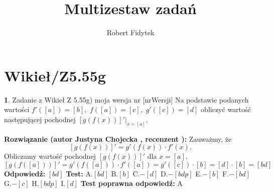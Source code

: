 \documentclass[12pt, a4paper]{article}
\title{Multizestaw zadań}
\author{Robert Fidytek}
\date{}
\theoremstyle{definition} %
\newtheorem{zad}{}
\newcommand{\kategoria}[1]{\section{#1}} %
\newcommand{\zadStart}[1]{\begin{zad}#1\newline} %
\newcommand{\zadStop}{\end{zad}}   %
\newcommand{\rozwStart}[2]{\noindent \textbf{Rozwiązanie (autor #1 , recenzent #2): }\newline} %
\newcommand{\rozwStop}{\newline}                                            %
\newcommand{\odpStart}{\noindent \textbf{Odpowiedź:}\newline}    %
\newcommand{\odpStop}{\newline}                                             %
\newcommand{\testStart}{\noindent \textbf{Test:}\newline} %
\newcommand{\testStop}{\newline} %
\newcommand{\kluczStart}{\noindent \textbf{Test poprawna odpowiedź:}\newline} %
\newcommand{\kluczStop}{\newline} %
\begin{document}
\maketitle


\kategoria{Wikieł/Z5.55g}
\zadStart{Zadanie z Wikieł Z 5.55g) moja wersja nr [nrWersji]}
Na podstawie podanych wartości $f'([a])=[b],$ $f([a])=[c],$ $g'([c])=[d]$ obliczyć wartość następującej pochodnej $\left[g(f(x))\right]'|_{x=[a]}$.
\zadStop
\rozwStart{Justyna Chojecka}{}
Zauważmy, że 
$$\left[g(f(x))\right]'=g'(f(x))\cdot f'(x).$$
Obliczamy wartość pochodnej $\left[g(f(x))\right]'$ dla $x=[a]$.
$$\left[g(f([a]))\right]'=g'(f([a]))\cdot f'([a])=g'([c])\cdot [b]=[d]\cdot [b]=[bd]$$
\rozwStop
\odpStart
$[bd]$
\odpStop
\testStart
A.$[bd]$
B.$[b]$
C.$-[d]$
D.$-[bdp]$
E.$-[b]$
F.$-[bd]$
G.$-[c]$
H.$[bdp]$
I.$[d]$
\testStop
\kluczStart
A
\kluczStop
\end{document}
